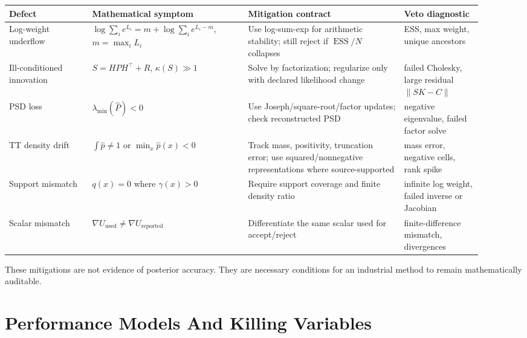 \small
\begin{longtable}{@{}p{0.16\linewidth}p{0.30\linewidth}p{0.30\linewidth}p{0.15\linewidth}@{}}
\toprule
Defect & Mathematical symptom & Mitigation contract & Veto diagnostic \\
\midrule
\endhead
Log-weight underflow &
\(\log\sum_i e^{L_i}=m+\log\sum_i e^{L_i-m}\), \(m=\max_iL_i\) &
Use log-sum-exp for arithmetic stability; still reject if
\(\operatorname{ESS}/N\) collapses &
ESS, max weight, unique ancestors \\
Ill-conditioned innovation &
\(S=HPH^\top+R\), \(\kappa(S)\gg1\) &
Solve by factorization; regularize only with declared likelihood change &
failed Cholesky, large residual \( \|SK-C\| \) \\
PSD loss &
\(\lambda_{\min}(\widehat P)<0\) &
Use Joseph/square-root/factor updates; check reconstructed PSD &
negative eigenvalue, failed factor solve \\
TT density drift &
\(\int\widehat p\ne1\) or \(\min_x\widehat p(x)<0\) &
Track mass, positivity, truncation error; use squared/nonnegative
representations where source-supported &
mass error, negative cells, rank spike \\
Support mismatch &
\(q(x)=0\) where \(\gamma(x)>0\) &
Require support coverage and finite density ratio &
infinite log weight, failed inverse or Jacobian \\
Scalar mismatch &
\(\nabla U_{\mathrm{used}}\ne\nabla U_{\mathrm{reported}}\) &
Differentiate the same scalar used for accept/reject &
finite-difference mismatch, divergences \\
\bottomrule
\end{longtable}
\normalsize

These mitigations are not evidence of posterior accuracy.  They are necessary
conditions for an industrial method to remain mathematically auditable.

\section{Performance Models And Killing Variables}
\label{sec:bf-hd-performance-models}

